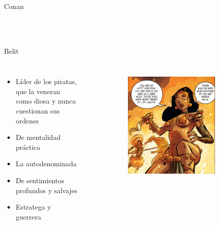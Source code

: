 \begin{frame}{Conan}
\begin{columns}
\begin{figure}[htp]
\begin{subfigure}[b]{0.23\textwidth}
			\end{subfigure}
		\end{figure}
	\end{columns}
\end{frame}
\note[itemize]{
	\item
}

\begin{frame}{Belit}
	\begin{columns}
		\begin{itemize}
			\item Líder de los piratas, que la veneran como diosa y nunca cuestionan sus ordenes
			\item De mentalidad práctica
			\item La autodenominada 
			\item De sentimientos profundos y salvajes
			\item Estratega y guerrera
		\end{itemize}
		\begin{figure}[htp]
			\centering
			\begin{subfigure}[b]{0.3\textwidth}
				\includegraphics[width=\textwidth]{img/belit/Ablaze}

\end{subfigure}
\end{figure}
\end{columns}
\end{frame}
